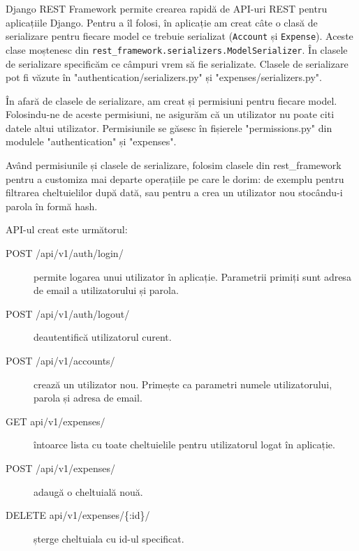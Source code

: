 Django REST Framework permite crearea rapidă de API-uri REST pentru 
aplicațiile Django. Pentru a îl folosi, în aplicație am creat
câte o clasă de serializare pentru fiecare model 
ce trebuie serializat (\texttt{Account} și \texttt{Expense}).
Aceste clase moștenesc din \texttt{rest\_framework.serializers.ModelSerializer}.
În clasele de serializare specificăm ce câmpuri vrem să fie serializate.
Clasele de serializare pot fi văzute în "authentication/serializers.py"
și "expenses/serializers.py".

În afară de clasele de serializare, am creat și permisiuni pentru fiecare
model. Folosindu-ne de aceste permisiuni, ne asigurăm că un utilizator
nu poate citi datele altui utilizator. Permisiunile se găsesc
în fișierele "permissions.py" din modulele "authentication" și
"expenses".

Având permisiunile și clasele de serializare, folosim clasele
din rest\_framework pentru a customiza mai departe
operațiile pe care le dorim: de exemplu pentru filtrarea 
cheltuielilor după dată, sau pentru a crea un utilizator nou
stocându-i parola în formă hash.

API-ul creat este următorul:
\begin{description}
\item [POST /api/v1/auth/login/] permite logarea unui
utilizator în aplicație. Parametrii primiți sunt
adresa de email a utilizatorului și parola.
\item [POST /api/v1/auth/logout/] deautentifică
utilizatorul curent.
\item [POST /api/v1/accounts/] crează un utilizator nou.
Primește ca parametri numele utilizatorului, parola
și adresa de email.
\item [GET api/v1/expenses/] întoarce lista cu toate
cheltuielile pentru utilizatorul logat în aplicație.
\item [POST /api/v1/expenses/] adaugă o cheltuială
nouă.
\item [DELETE api/v1/expenses/\{:id\}/] șterge cheltuiala
cu id-ul specificat.
\end{description}

